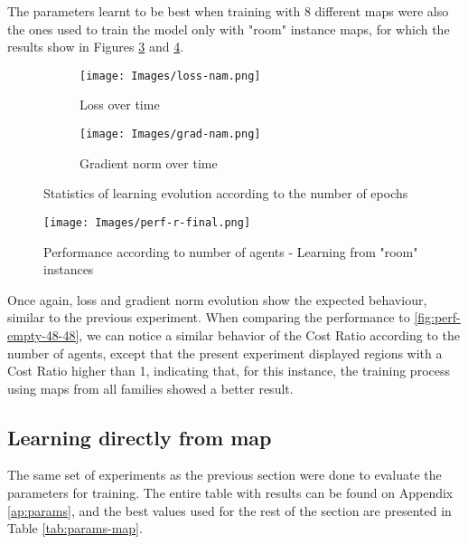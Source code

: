 The parameters learnt to be best when training with 8 different maps were also the ones used to train the model only with "room" instance maps, for which the results show in Figures \ref{fig:loss-graph-room} and \ref{fig:perf-agents-features-room}.

\begin{figure}[!ht]
    \centering
    \begin{subfigure}[b]{0.45\textwidth}
        \texttt{[image: Images/loss-nam.png]}
        \caption{Loss over time}
        \label{fig:loss-room}
    \end{subfigure}
    \hspace{0.01\textwidth}
    \begin{subfigure}[b]{0.45\textwidth}
        \texttt{[image: Images/grad-nam.png]}
        \caption{Gradient norm over time}
        \label{fig:grad-room}
    \end{subfigure}
    
    \caption{Statistics of learning evolution according to the number of epochs}
    \label{fig:loss-graph-room}
\end{figure}


\begin{figure}[!ht]
    \centering
    \texttt{[image: Images/perf-r-final.png]}
    \caption{Performance according to number of agents - Learning from "room" instances}
    \label{fig:perf-agents-features-room}
\end{figure}

Once again, loss and gradient norm evolution show the expected behaviour, similar to the previous experiment. When comparing the performance to \ref{fig:perf-empty-48-48}, we can notice a similar behavior of the Cost Ratio according to the number of agents, except that the present experiment displayed regions with a Cost Ratio higher than 1, indicating that, for this instance, the training process using maps from all families showed a better result.

\subsection{Learning directly from map}

The same set of experiments as the previous section were done to evaluate the parameters for training. The entire table with results can be found on Appendix \ref{ap:params}, and the best values used for the rest of the section are presented in Table \ref{tab:params-map}.

